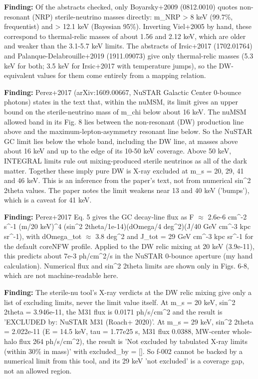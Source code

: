 \documentclass[11pt,a4paper]{article}
\begin{document}
\textbf{Finding:} Of the abstracts checked, only Boyarsky+2009 (0812.0010) quotes non-resonant (NRP) sterile-neutrino masses directly: m\_NRP \textgreater{} 8 keV (99.7\%, frequentist) and \textgreater{} 12.1 keV (Bayesian 95\%). Inverting Viel+2005 by hand, these correspond to thermal-relic masses of about 1.56 and 2.12 keV, which are older and weaker than the 3.1-5.7 keV limits. The abstracts of Irsic+2017 (1702.01764) and Palanque-Delabrouille+2019 (1911.09073) give only thermal-relic masses (5.3 keV for both; 3.5 keV for Irsic+2017 with temperature jumps), so the DW-equivalent values for them come entirely from a mapping relation.

\textbf{Finding:} Perez+2017 (arXiv:1609.00667, NuSTAR Galactic Center 0-bounce photons) states in the text that, within the nuMSM, its limit gives an upper bound on the sterile-neutrino mass of m\_chi below about 16 keV. The nuMSM allowed band in its Fig. 8 lies between the non-resonant (DW) production line above and the maximum-lepton-asymmetry resonant line below. So the NuSTAR GC limit lies below the whole band, including the DW line, at masses above about 16 keV and up to the edge of its 10-50 keV coverage. Above 50 keV, INTEGRAL limits rule out mixing-produced sterile neutrinos as all of the dark matter. Together these imply pure DW is X-ray excluded at m\_s = 20, 29, 41 and 46 keV. This is an inference from the paper's text, not from numerical sin\textasciicircum{}2 2theta values. The paper notes the limit weakens near 13 and 40 keV ('bumps'), which is a caveat for 41 keV.

\textbf{Finding:} Perez+2017 Eq. 5 gives the GC decay-line flux as F $\approx$ 2.6e-6 cm\textasciicircum{}-2 s\textasciicircum{}-1 (m/20 keV)\textasciicircum{}4 (sin\textasciicircum{}2 2theta/1e-14)(dOmega/4 deg\textasciicircum{}2)(J/40 GeV cm\textasciicircum{}-3 kpc sr\textasciicircum{}-1), with dOmega\_tot $\approx$ 3.8 deg\textasciicircum{}2 and J\_tot = 29 GeV cm\textasciicircum{}-3 kpc sr\textasciicircum{}-1 for the default coreNFW profile. Applied to the DW relic mixing at 20 keV (3.9e-11), this predicts about 7e-3 ph/cm\textasciicircum{}2/s in the NuSTAR 0-bounce aperture (my hand calculation). Numerical flux and sin\textasciicircum{}2 2theta limits are shown only in Figs. 6-8, which are not machine-readable here.

\textbf{Finding:} The sterile-nu tool's X-ray verdicts at the DW relic mixing give only a list of excluding limits, never the limit value itself. At m\_s = 20 keV, sin\textasciicircum{}2 2theta = 3.946e-11, the M31 flux is 0.0171 ph/s/cm\textasciicircum{}2 and the result is 'EXCLUDED by: NuSTAR M31 (Roach+ 2020)'. At m\_s = 29 keV, sin\textasciicircum{}2 2theta = 2.022e-11 (E = 14.5 keV, tau = 1.77e25 s, M31 flux 0.0388, MW-center whole-halo flux 264 ph/s/cm\textasciicircum{}2), the result is 'Not excluded by tabulated X-ray limits (within 30\% in mass)' with excluded\_by = []. So f-002 cannot be backed by a numerical limit from this tool, and its 29 keV 'not excluded' is a coverage gap, not an allowed region.
\end{document}
